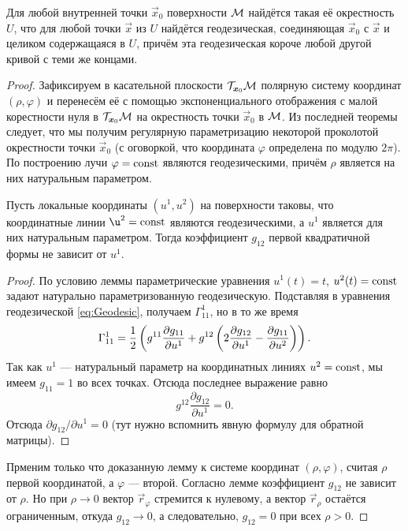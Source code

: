\begin{theorem}
	Для любой внутренней точки $\vec{x}_0$ поверхности $\mathcal{M}$ найдётся такая её окрестность $U$, что для любой точки $\vec{x}$ из $U$ найдётся геодезическая, соединяющая $\vec{x}_0$ с $\vec{x}$ и целиком содержащаяся в $U$, причём эта геодезическая короче любой другой кривой с теми же концами.
\end{theorem}

\begin{proof}
	Зафиксируем в касательной плоскости $\mathcal{T}_{\boldsymbol{x}_0}\mathcal{M}$ полярную систему координат $(\rho, \varphi)$ и перенесём её с помощью экспоненциального отображения с малой корестности нуля в $\mathcal{T}_{\boldsymbol{x}_0}\mathcal{M}$ на окрестность точки $\vec{x}_0$ в $\mathcal{M}$. Из последней теоремы следует, что мы получим регулярную параметризацию некоторой проколотой окрестности точки $\vec{x}_0$ (с оговоркой, что координата $\varphi$ определена по модулю $2\pi$). По построению лучи $\varphi = \mathrm{const}$ являются геодезическими, причём $\rho$ является на них натуральным параметром.

	\begin{lemma}
		Пусть локальные координаты $(u^1, u^2)$ на поверхности таковы, что координатные линии $\u^2 = \const$ являются геодезическими, а $u^1$ является для них натуральным параметром. Тогда коэффициент $g_{12}$ первой квадратичной формы не зависит от $u^1$.
	\end{lemma}

	\begin{proof}
		По условию леммы параметрические уравнения $u^1(t) = t$, $u^2(t) \hm= \const$ задают натурально параметризованную геодезическую. Подставляя в уравнения геодезической \eqref{eq:Geodesic}, получаем $\Gamma_{11}^1$, но в то же время
		\[
			\Gamma_{11}^1 = \frac{1}{2}\left(g^{11}\frac{\partial g_{11}}{\partial u^1} + g^{12}\left(2\frac{\partial g_{12}}{\partial u^1} - \frac{\partial g_{11}}{\partial u^2}\right)\right).
		\]
		Так как $u^1$ --- натуральный параметр на координатных линиях $u^2 = \mathrm{const}$, мы имеем $g_{11} = 1$ во всех точках. Отсюда последнее выражение равно
		\[
			g^{12}\frac{\partial g_{12}}{\partial u^1} = 0.
		\]
		Отсюда $\partial g_{12} / \partial u^1 = 0$ (тут нужно вспомнить явную формулу для обратной матрицы).
	\end{proof}

	Прменим только что доказанную лемму к системе координат $(\rho, \varphi)$, считая $\rho$ первой координатой, а $\varphi$ --- второй. Согласно лемме коэффициент $g_{12}$ не зависит от $\rho$. Но при $\rho \to 0$ вектор $\vec{r}_\varphi$ стремится к нулевому, а вектор $\vec{r}_\rho$ остаётся ограниченным, откуда $g_{12} \to 0$, а следовательно, $g_{12} = 0$ при всех $\rho > 0$.


\end{proof}
